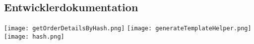 \subsection{Entwicklerdokumentation}
\label{app:Doc}
\begin{center}
\texttt{[image: getOrderDetailsByHash.png]}
\texttt{[image: generateTemplateHelper.png]}
\texttt{[image: hash.png]}
\end{center}
